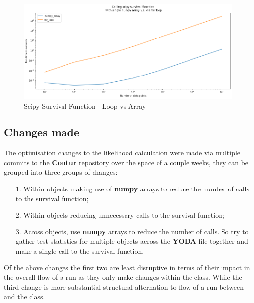 \begin{figure}[H]
\centering
\includegraphics[scale=0.5]{plots/scipy_profile.png}
\caption{Scipy Survival Function - Loop vs Array}
\label{fig:loop_v_array}
\end{figure} 

\subsection{Changes made}
The optimisation changes to the likelihood calculation were made via multiple commits to the \textbf{Contur} repository over the space of a couple weeks, they can be grouped into three groups of changes:

\begin{itemize}
\item[1.] Within  objects making use of \textbf{numpy} arrays to reduce the number of calls to the survival function;
\item[2.] Within  objects reducing unnecessary calls to the survival function;
\item[3.] Across  objects, use \textbf{numpy} arrays to reduce the number of calls. So try to gather test statistics for multiple  objects across the \textbf{YODA} file together and make a single call to the survival function.
\end{itemize}

Of the above changes the first two are least disruptive in terms of their impact in the overall flow of a run as they only make changes within the  class. While the third change is more substantial structural alternation to flow of a run between  and the  class.

